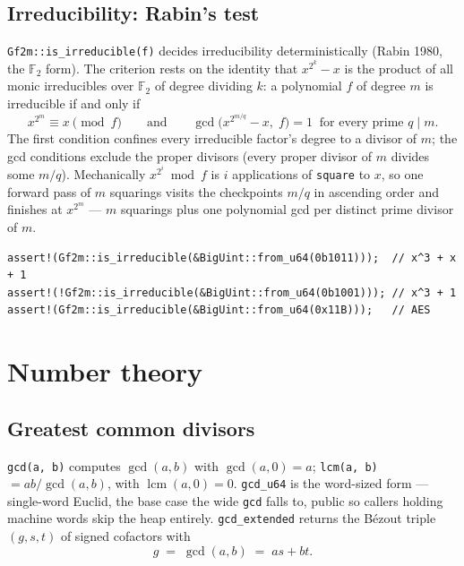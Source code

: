 \documentclass[11pt]{article}
\newcommand{\code}[1]{\texttt{#1}}
\newcommand{\F}{\mathbb{F}}
\begin{document}
\subsection{Irreducibility: Rabin's test}

\code{Gf2m::is\_irreducible(f)} decides irreducibility deterministically
(Rabin 1980, the $\F_2$ form). The criterion rests on the identity that
$x^{2^k} - x$ is the product of all monic irreducibles over $\F_2$ of
degree dividing $k$: a polynomial $f$ of degree $m$ is irreducible if and
only if
\begin{equation}
x^{2^m} \equiv x \pmod{f}
\qquad\text{and}\qquad
\gcd\bigl(x^{2^{m/q}} - x,\; f\bigr) = 1
\;\;\text{for every prime } q \mid m .
\end{equation}
The first condition confines every irreducible factor's degree to a divisor
of $m$; the gcd conditions exclude the proper divisors (every proper
divisor of $m$ divides some $m/q$). Mechanically $x^{2^i} \bmod f$ is $i$
applications of \code{square} to $x$, so one forward pass of $m$ squarings
visits the checkpoints $m/q$ in ascending order and finishes at
$x^{2^m}$ --- $m$ squarings plus one polynomial gcd per distinct prime
divisor of $m$.

\begin{lstlisting}
assert!(Gf2m::is_irreducible(&BigUint::from_u64(0b1011)));  // x^3 + x + 1
assert!(!Gf2m::is_irreducible(&BigUint::from_u64(0b1001))); // x^3 + 1
assert!(Gf2m::is_irreducible(&BigUint::from_u64(0x11B)));   // AES
\end{lstlisting}
\section{Number theory}

\subsection{Greatest common divisors}

\code{gcd(a, b)} computes $\gcd(a, b)$ with $\gcd(a, 0) = a$;
\code{lcm(a, b)} $= ab / \gcd(a, b)$, with $\operatorname{lcm}(a, 0) = 0$.
\code{gcd\_u64} is the word-sized form --- single-word Euclid, the base
case the wide \code{gcd} falls to, public so callers holding machine words
skip the heap entirely. \code{gcd\_extended} returns the B\'ezout triple
$(g, s, t)$ of signed cofactors with
\begin{equation}
g \;=\; \gcd(a, b) \;=\; a s + b t .
\end{equation}
\end{document}
